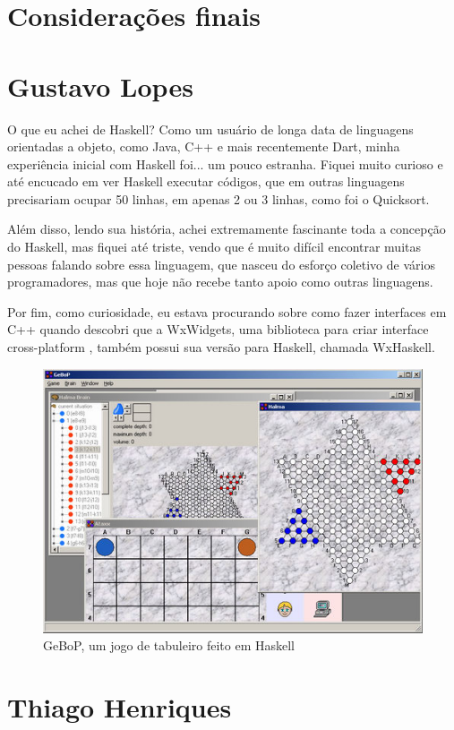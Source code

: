 \documentclass[
	article,			%
	11pt,				%
	oneside,			%
	a4paper,			%
	english,			%
	brazil,				%
	sumario=tradicional
	]{abntex2}
\begin{document}
    \chapter{Considerações finais}

    
    \begin{apendicesenv}

        \partapendices
        \chapter{Gustavo Lopes}

        O que eu achei de Haskell? Como um usuário de longa data de linguagens orientadas a objeto, 
        como Java, C++ e mais recentemente Dart, minha experiência inicial com Haskell foi...
        um pouco estranha. Fiquei muito curioso e até encucado em ver Haskell executar códigos, que em
        outras linguagens precisariam ocupar 50 linhas, em apenas 2 ou 3 linhas, como foi o Quicksort.

        Além disso, lendo sua história, achei extremamente fascinante toda a concepção do Haskell,
        mas fiquei até triste, vendo que é muito difícil encontrar muitas pessoas falando sobre essa linguagem, que nasceu 
        do esforço coletivo de vários programadores, mas que hoje não recebe tanto apoio como outras linguagens.

        Por fim, como curiosidade, eu estava procurando sobre como fazer interfaces em C++ quando
        descobri que a WxWidgets, uma biblioteca para criar interface cross-platform , também possui 
        sua versão para Haskell, chamada WxHaskell.

        \begin{figure}[ht]
          \includegraphics[width =\textwidth]{gebob.png}
          \caption{GeBoP, um jogo de tabuleiro feito em Haskell}
        \end{figure}

        \newpage
        \chapter{Thiago Henriques}


    
    \end{apendicesenv}
\end{document}
